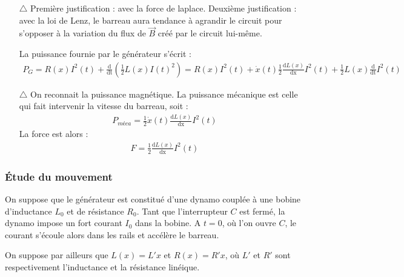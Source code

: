 \documentclass{report}
\begin{document}
\begin{itemize}

	\item[$\triangle$] Première justification : avec la force de laplace. Deuxième justification : avec la loi de Lenz, le barreau aura tendance à agrandir le circuit pour s'opposer à la variation du flux de $\vec{B}$ créé par le circuit lui-même.
	
	La puissance fournie par le générateur s'écrit :
	\begin{align*}
		P_G=R(x)I^2(t)+\frac{\mathrm{d}} {\mathrm{dt}}\left(\frac{1}{2}L(x)I(t)^2\right) = R(x)I^2(t) + \dot{x}(t)\frac{1}{2}\frac{\mathrm{d}L(x)}{\mathrm{dx}}I^2(t)+\frac{1}{2}L(x)\frac{\mathrm{d}} {\mathrm{dt}}I^2(t)
	\end{align*}
	
	\item[$\triangle$] On reconnait la puissance magnétique. La puissance mécanique est celle qui fait intervenir la vitesse du barreau, soit :
	\begin{align*}
		P_{méca}=\frac{1}{2}\dot{x}(t)\frac{\mathrm{d}L(x)}{\mathrm{dx}}I^2(t)
	\end{align*}	
La force est alors :
	\begin{align*}
		F=\frac{1}{2}\frac{\mathrm{d}L(x)}{\mathrm{dx}}I^2(t)
	\end{align*}	

\end{itemize}

\subsubsection*{Étude du mouvement}

On suppose que le générateur est constitué d'une dynamo couplée à une bobine d'inductance $L_0$ et de résistance $R_0$. Tant que l'interrupteur $C$ est fermé, la dynamo impose un fort courant $I_0$ dans la bobine. A $t=0$, où l'on ouvre $C$, le courant s'écoule alors dans les rails et accélère le barreau. 

On suppose par ailleurs que $L(x)=L'x$ et $R(x)=R'x$, où $L'$ et $R'$ sont respectivement l'inductance et la résistance linéique.
\end{document}
